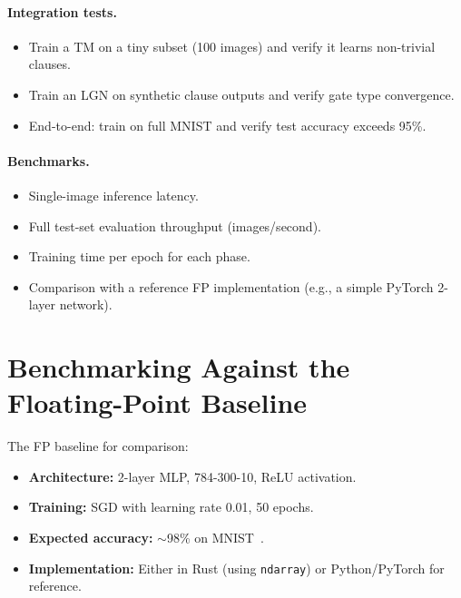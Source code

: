 \paragraph{Integration tests.}
\begin{itemize}
  \item Train a TM on a tiny subset (100 images) and verify it
    learns non-trivial clauses.
  \item Train an LGN on synthetic clause outputs and verify gate
    type convergence.
  \item End-to-end: train on full MNIST and verify test accuracy
    exceeds 95\%.
\end{itemize}

\paragraph{Benchmarks.}
\begin{itemize}
  \item Single-image inference latency.
  \item Full test-set evaluation throughput (images/second).
  \item Training time per epoch for each phase.
  \item Comparison with a reference FP implementation (e.g., a
    simple PyTorch 2-layer network).
\end{itemize}


\section{Benchmarking Against the Floating-Point Baseline}
\label{sec:benchmarking}

The FP baseline for comparison:

\begin{itemize}
  \item \textbf{Architecture:} 2-layer MLP, 784-300-10, ReLU
    activation.
  \item \textbf{Training:} SGD with learning rate 0.01, 50 epochs.
  \item \textbf{Expected accuracy:} $\sim$98\% on MNIST~\cite{lecun1998mnist}.
  \item \textbf{Implementation:} Either in Rust (using
    \texttt{ndarray}) or Python/PyTorch for reference.
\end{itemize}

